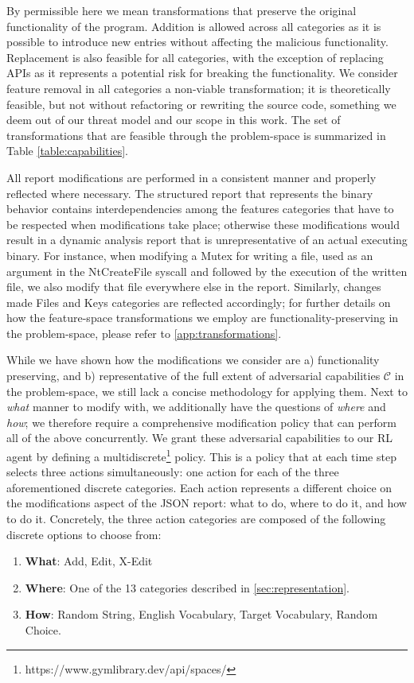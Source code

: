 By permissible here we mean transformations that preserve the original functionality of the program.
Addition is allowed across all categories as it is possible to introduce new entries without affecting the malicious functionality.
Replacement is also feasible for all categories, with the exception of replacing APIs as it represents a potential risk for breaking the functionality.
We consider feature removal in all categories a non-viable transformation; it is theoretically feasible, but not without refactoring or rewriting the source code, something we deem out of our threat model and our scope in this work.
The set of transformations that are feasible through the problem-space is summarized in Table \ref{table:capabilities}.

All report modifications are performed in a consistent manner and properly reflected where necessary.
The structured report that represents the binary behavior contains interdependencies among the features categories that have to be respected when modifications take place; otherwise these modifications would result in a dynamic analysis report that is unrepresentative of an actual executing binary.
For instance, when modifying a Mutex for writing a file, used as an argument in the NtCreateFile syscall and followed by the execution of the written file, we also modify that file everywhere else in the report.
Similarly, changes made Files and Keys categories are reflected accordingly; for further details on how the feature-space transformations we employ are functionality-preserving in the problem-space, please refer to \autoref{app:transformations}.

While we have shown how the modifications we consider are a) functionality preserving, and b) representative of the full extent of adversarial capabilities $\mathcal{C}$ in the problem-space, we still lack a concise methodology for applying them.
Next to \textit{what} manner to modify with, we additionally have the questions of \textit{where} and \textit{how}; we therefore require a comprehensive modification policy that can perform all of the above concurrently.
We grant these adversarial capabilities to our \gls{RL} agent by defining a multidiscrete\footnote{https://www.gymlibrary.dev/api/spaces/} policy.
This is a policy that at each time step selects three actions simultaneously: one action for each of the three aforementioned discrete categories.
Each action represents a different choice on the modifications aspect of the JSON report: what to do, where to do it, and how to do it.
Concretely, the three action categories are composed of the following discrete options to choose from:
\begin{enumerate}
    \item \textbf{What}: Add, Edit, X-Edit
    \item \textbf{Where}: One of the 13 categories described in \ref{sec:representation}.
    \item \textbf{How}: Random String, English Vocabulary, Target Vocabulary, Random Choice.
\end{enumerate}

